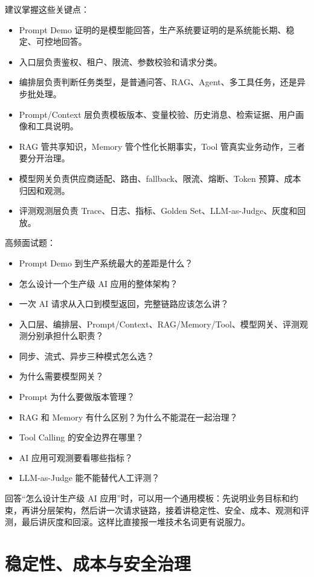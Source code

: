 \documentclass[9pt,a4paper,twocolumn]{ctexart}
\begin{document}
建议掌握这些关键点：


\begin{itemize}[itemsep=1pt, topsep=2pt]
  \item Prompt Demo 证明的是模型能回答，生产系统要证明的是系统能长期、稳定、可控地回答。
  \item 入口层负责鉴权、租户、限流、参数校验和请求分类。
  \item 编排层负责判断任务类型，是普通问答、RAG、Agent、多工具任务，还是异步批处理。
  \item Prompt/Context 层负责模板版本、变量校验、历史消息、检索证据、用户画像和工具说明。
  \item RAG 管共享知识，Memory 管个性化长期事实，Tool 管真实业务动作，三者要分开治理。
  \item 模型网关负责供应商适配、路由、fallback、限流、熔断、Token 预算、成本归因和观测。
  \item 评测观测层负责 Trace、日志、指标、Golden Set、LLM-as-Judge、灰度和回放。
\end{itemize}


高频面试题：


\begin{itemize}[itemsep=1pt, topsep=2pt]
  \item Prompt Demo 到生产系统最大的差距是什么？
  \item 怎么设计一个生产级 AI 应用的整体架构？
  \item 一次 AI 请求从入口到模型返回，完整链路应该怎么讲？
  \item 入口层、编排层、Prompt/Context、RAG/Memory/Tool、模型网关、评测观测分别承担什么职责？
  \item 同步、流式、异步三种模式怎么选？
  \item 为什么需要模型网关？
  \item Prompt 为什么要做版本管理？
  \item RAG 和 Memory 有什么区别？为什么不能混在一起治理？
  \item Tool Calling 的安全边界在哪里？
  \item AI 应用可观测要看哪些指标？
  \item LLM-as-Judge 能不能替代人工评测？
\end{itemize}


回答“怎么设计生产级 AI 应用”时，可以用一个通用模板：先说明业务目标和约束，再讲分层架构，然后讲一次请求链路，接着讲稳定性、安全、成本、观测和评测，最后讲灰度和回滚。这样比直接报一堆技术名词更有说服力。



\section*{稳定性、成本与安全治理}
\end{document}
